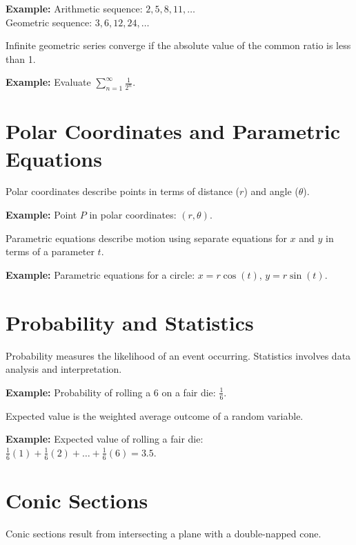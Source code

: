 \documentclass{article}
\begin{document}
\begin{framed}
\textbf{Example:}
Arithmetic sequence: \(2, 5, 8, 11, \ldots\) \\
Geometric sequence: \(3, 6, 12, 24, \ldots\)
\end{framed}

Infinite geometric series converge if the absolute value of the common ratio is less than 1.

\begin{framed}
\textbf{Example:}
Evaluate \(\sum_{n=1}^{\infty} \frac{1}{2^n}\).
\end{framed}

\section{Polar Coordinates and Parametric Equations}
Polar coordinates describe points in terms of distance (\(r\)) and angle (\(\theta\)).

\begin{framed}
\textbf{Example:}
Point \(P\) in polar coordinates: \((r, \theta)\).
\end{framed}

Parametric equations describe motion using separate equations for \(x\) and \(y\) in terms of a parameter \(t\).

\begin{framed}
\textbf{Example:}
Parametric equations for a circle: \(x = r\cos(t)\), \(y = r\sin(t)\).
\end{framed}

\section{Probability and Statistics}
Probability measures the likelihood of an event occurring. Statistics involves data analysis and interpretation.

\begin{framed}
\textbf{Example:}
Probability of rolling a 6 on a fair die: \(\frac{1}{6}\).
\end{framed}

Expected value is the weighted average outcome of a random variable.

\begin{framed}
\textbf{Example:}
Expected value of rolling a fair die: \(\frac{1}{6}(1) + \frac{1}{6}(2) + \ldots + \frac{1}{6}(6) = 3.5\).
\end{framed}

\section{Conic Sections}
Conic sections result from intersecting a plane with a double-napped cone.
\end{document}
